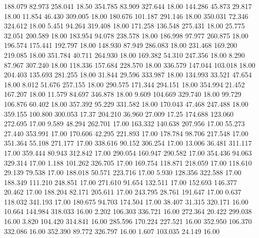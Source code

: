  188.079   82.973  258.041        18.50
 354.785   83.909  327.644        18.00
 144.286   45.873   29.817        18.00
  11.854   46.430  309.005        18.00
 180.676  101.187  291.146        18.00
 350.031   72.346  324.612        18.00
   5.451   94.264  319.408        18.00
 171.258  136.548  275.431        18.00
  25.775   32.051  200.589        18.00
 183.954   94.078  238.578        18.00
 186.998   97.977  260.875        18.00
 196.574  175.441  192.797        18.00
 148.930   87.949  286.083        18.00
 231.468  169.200  219.085        18.00
 351.784   40.711  264.930        18.00
 169.382   54.310  247.356        18.00
   8.290   87.967  307.240        18.00
 118.336  157.684  228.570        18.00
 336.579  147.044  103.018        18.00
 204.403  135.693  281.255        18.00
  31.844   29.596  333.987        18.00
 134.993   33.521   47.654        18.00
   8.012   51.676  257.155        18.00
 290.575  171.344  294.151        18.00
 354.994   21.452  167.207        18.00
  11.579   84.697  346.878        18.00
   9.609  104.669  329.740        18.00
  99.729  106.876   60.402        18.00
 357.392   95.229  331.582        18.00
 170.043   47.468  247.488        18.00
 359.155  100.800  300.053        17.37
 204.210   36.960   27.009        17.25
 174.688  123.060  272.695        17.00
   9.589   48.294  262.701        17.00
 163.332  140.638  207.956        17.00
  55.273   27.440  353.991        17.00
 170.606   42.295  221.893        17.00
 178.784   98.706  217.548        17.00
 351.364   55.108  271.177        17.00
 338.616   90.152  306.254        17.00
  13.006   36.481  311.117        17.00
 359.444   80.943  312.842        17.00
 290.054  160.947  290.582        17.00
 354.436   94.063  329.314        17.00
   1.188  101.262  326.705        17.00
 169.754  118.871  218.059        17.00
 118.610   29.139   79.538        17.00
 188.018   50.571  223.716        17.00
   5.930  128.356  322.588        17.00
 188.349  111.210  248.851        17.00
 271.610   91.654  132.511        17.00
 152.693  146.377   20.462        17.00
 188.204   82.171  205.611        17.00
 243.795   28.761  191.647        17.00
   0.637  118.032  341.193        17.00
 180.675   94.703  174.504        17.00
  38.407   31.315  320.171        16.00
  10.664  144.984  318.033        16.00
   2.202  106.303  336.721        16.00
 272.364   20.422  299.038        16.00
   3.820  104.420  314.841        16.00
 285.596  170.224  227.521        16.00
 352.950  106.370  332.086        16.00
 352.390   89.772  326.797        16.00
   1.607  103.035   24.149        16.00
